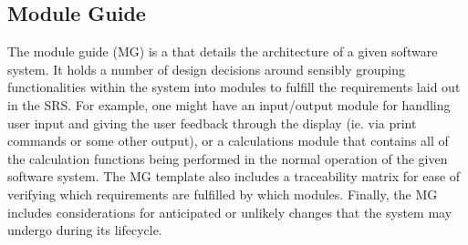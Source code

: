 

\subsection{Module Guide}

The module guide (MG) is a \sf{} that details the architecture of a given 
software system. It holds a number of design decisions around sensibly grouping 
functionalities within the system into modules to fulfill the requirements laid 
out in the SRS. For example, one might have an input/output module for handling 
user input and giving the user feedback through the display (ie. via print 
commands or some other output), or a calculations module that contains all of 
the calculation functions being performed in the normal operation of the given 
software system. The \smithea{} MG template also includes a traceability matrix 
for ease of verifying which requirements are fulfilled by which modules.
Finally, the MG includes considerations for anticipated or unlikely changes 
that the system may undergo during its lifecycle.

